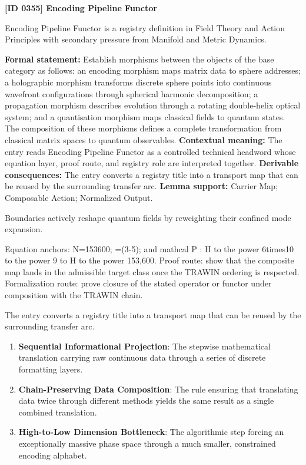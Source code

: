 \clearpage
\noindent\textbf{[ID 0355] Encoding Pipeline Functor}\par
\vspace{0.35em}
\begingroup\small
{}
Encoding Pipeline Functor is a registry definition in Field Theory and Action Principles with secondary pressure from Manifold and Metric Dynamics.

\begingroup\footnotesize\setlength{\emergencystretch}{3em}\sloppy
\textbf{Formal statement:} Establish morphisms between the objects of the base category as follows: an encoding morphism maps matrix data to sphere addresses; a holographic morphism transforms discrete sphere points into continuous wavefront configurations through spherical harmonic decomposition; a propagation morphism describes evolution through a rotating double-helix optical system; and a quantisation morphism maps classical fields to quantum states. The composition of these morphisms defines a complete transformation from classical matrix spaces to quantum observables. \textbf{Contextual meaning:} The entry reads Encoding Pipeline Functor as a controlled technical headword whose equation layer, proof route, and registry role are interpreted together. \textbf{Derivable consequences:} The entry converts a registry title into a transport map that can be reused by the surrounding transfer arc. \textbf{Lemma support:} Carrier Map; Composable Action; Normalized Output.\par
\endgroup

Boundaries actively reshape quantum fields by reweighting their confined mode expansion.

Equation anchors: N=153600; =(3-5); and mathcal P : H to the power 6times10 to the power 9 to H to the power 153,600. Proof route: show that the composite map lands in the admissible target class once the TRAWIN ordering is respected. Formalization route: prove closure of the stated operator or functor under composition with the TRAWIN chain.

The entry converts a registry title into a transport map that can be reused by the surrounding transfer arc.
\endgroup

\begin{enumerate}[leftmargin=1.6em,itemsep=6pt,topsep=4pt]
\item \textbf{Sequential Informational Projection}: The stepwise mathematical translation carrying raw continuous data through a series of discrete formatting layers.
\item \textbf{Chain-Preserving Data Composition}: The rule ensuring that translating data twice through different methods yields the same result as a single combined translation.
\item \textbf{High-to-Low Dimension Bottleneck}: The algorithmic step forcing an exceptionally massive phase space through a much smaller, constrained encoding alphabet.
\end{enumerate}

